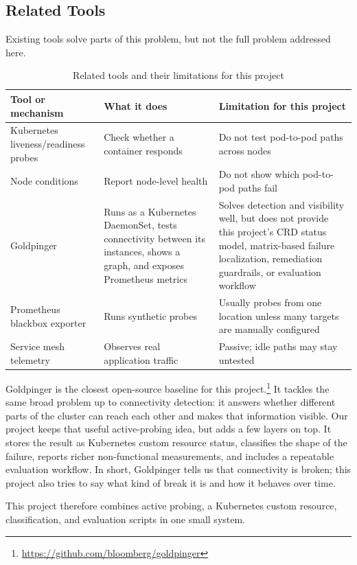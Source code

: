 \documentclass[11pt,a4paper]{article}
\begin{document}
\subsection{Related Tools}

Existing tools solve parts of this problem, but not the full problem addressed here.

\begin{table}[h]
\centering
\caption{Related tools and their limitations for this project}
\begin{tabularx}{\textwidth}{@{}lYY@{}}
\toprule
\textbf{Tool or mechanism} & \textbf{What it does} & \textbf{Limitation for this project} \\
\midrule
Kubernetes liveness/readiness probes & Check whether a container responds & Do not test pod-to-pod paths across nodes \\
Node conditions & Report node-level health & Do not show which pod-to-pod paths fail \\
Goldpinger & Runs as a Kubernetes DaemonSet, tests connectivity between its instances, shows a graph, and exposes Prometheus metrics & Solves detection and visibility well, but does not provide this project's CRD status model, matrix-based failure localization, remediation guardrails, or evaluation workflow \\
Prometheus blackbox exporter & Runs synthetic probes & Usually probes from one location unless many targets are manually configured \\
Service mesh telemetry & Observes real application traffic & Passive; idle paths may stay untested \\
\bottomrule
\end{tabularx}
\end{table}

Goldpinger is the closest open-source baseline for this project.\footnote{\url{https://github.com/bloomberg/goldpinger}} It tackles the same broad problem up to connectivity detection: it answers whether different parts of the cluster can reach each other and makes that information visible. Our project keeps that useful active-probing idea, but adds a few layers on top. It stores the result as Kubernetes custom resource status, classifies the shape of the failure, reports richer non-functional measurements, and includes a repeatable evaluation workflow. In short, Goldpinger tells us that connectivity is broken; this project also tries to say what kind of break it is and how it behaves over time.

This project therefore combines active probing, a Kubernetes custom resource, classification, and evaluation scripts in one small system.
\end{document}
